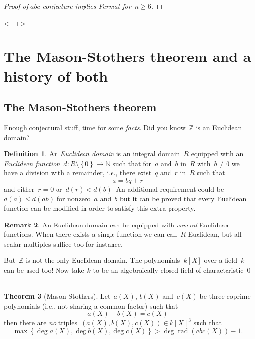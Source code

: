 \documentclass[11pt, a4paper, openany, oneside, article]{memoir}
\theoremstyle{definition}
\newtheorem{theorem}{Theorem}
\newtheorem{definition}[theorem]{Definition}
\newtheorem{remark}[theorem]{Remark}
\DeclareMathOperator\rad{rad}
\begin{document}
\begin{proof}[Proof of $abc$-conjecture implies Fermat for~$n\geq 6$]
\end{proof}<++>

\clearpage


\section{The Mason-Stothers theorem and a history of both}

\subsection{The Mason-Stothers theorem}

Enough conjectural stuff, time for some \emph{facts}. Did you know~$\mathbb{Z}$ is an Euclidean domain?

\begin{definition}
  An \emph{Euclidean domain} is an integral domain~$R$ equipped with an \emph{Euclidean function}~$d\colon R\setminus\left\{ 0 \right\}\to\mathbb{N}$ such that for~$a$ and~$b$ in~$R$ with~$b\neq 0$ we have a division with a remainder, i.e., there exist~$q$ and~$r$ in~$R$ such that
  \begin{equation}
    a=bq+r
  \end{equation}
  and either~$r=0$ or~$d(r)<d(b)$. An additional requirement could be~$d(a)\leq d(ab)$ for nonzero~$a$ and~$b$ but it can be proved that every Euclidean function can be modified in order to satisfy this extra property.
\end{definition}

\begin{remark}
  An Euclidean domain can be equipped with \emph{several} Euclidean functions. When there exists a single function we can call~$R$ Euclidean, but all scalar multiples suffice too for instance.
\end{remark}

But~$\mathbb{Z}$ is not the only Euclidean domain. The polynomials~$k[X]$ over a field~$k$ can be used too! Now take~$k$ to be an algebraically closed field of characteristic~$0$.

\begin{theorem}[Mason-Stothers]
  \label{theorem:mason-stothers}
  Let~$a(X)$, $b(X)$ and~$c(X)$ be three coprime polynomials (i.e., not sharing a common factor) such that
  \begin{equation}
    a(X)+b(X)=c(X)
  \end{equation}
  then there are \emph{no} triples~$(a(X),b(X),c(X))\in k[X]^3$ such that
  \begin{equation}
    \max\left\{ \deg a(X),\deg b(X),\deg c(X) \right\}>\deg\rad(abc(X))-1.
  \end{equation}
\end{theorem}
\end{document}

